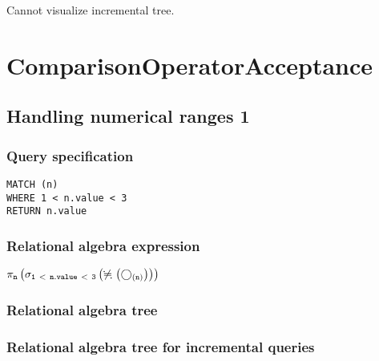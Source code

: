 Cannot visualize incremental tree.

\section{ComparisonOperatorAcceptance}

\subsection{Handling numerical ranges 1}

\subsubsection*{Query specification}

\begin{lstlisting}
MATCH (n)
WHERE 1 < n.value < 3
RETURN n.value
\end{lstlisting}

\subsubsection*{Relational algebra expression}

$\projection{\var{n}} \left(\selection{\mathtt{1~<~n.value~<~3}} \left(\alldifferent{} \left(\getvertices{n}{}\right)\right)\right)$

\subsubsection*{Relational algebra tree}


\subsubsection*{Relational algebra tree for incremental queries}


